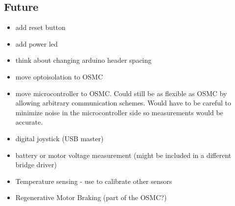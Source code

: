 \documentclass[letterpaper,12pt,notitlepage]{report}
\begin{document}
\subsection{Future}
\begin{itemize}
 \item add reset button
 \item add power led
 \item think about changing arduino header spacing
 \item move optoisolation to OSMC
 \item move microcontroller to OSMC.  Could still be as flexible as OSMC by allowing arbitrary communication schemes.  Would have to be careful to minimize noise in the microcontroller side so measurements would be accurate.
 \item digital joystick (USB master)
 \item battery or motor voltage measurement (might be included in a different bridge driver)
 \item Temperature sensing - use to calibrate other sensors
 \item Regenerative Motor Braking (part of the OSMC?)
\end{itemize}
\end{document}
